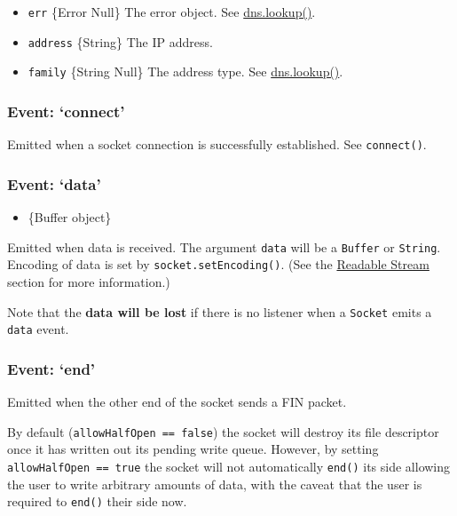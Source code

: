 \begin{itemize}
\itemsep1pt\parskip0pt
\item
  \texttt{err} \{Error \textbar{} Null\} The error object. See
  \href{dns.html\#dns_dns_lookup_domain_family_callback}{dns.lookup()}.
\item
  \texttt{address} \{String\} The IP address.
\item
  \texttt{family} \{String \textbar{} Null\} The address type. See
  \href{dns.html\#dns_dns_lookup_domain_family_callback}{dns.lookup()}.
\end{itemize}

\subsubsection{\texorpdfstring{Event:
`connect'}{Event: connect}}\label{event-connect}

Emitted when a socket connection is successfully established. See
\texttt{connect()}.

\subsubsection{\texorpdfstring{Event:
`data'}{Event: data}}\label{event-data}

\begin{itemize}
\itemsep1pt\parskip0pt
\item
  \{Buffer object\}
\end{itemize}

Emitted when data is received. The argument \texttt{data} will be a
\texttt{Buffer} or \texttt{String}. Encoding of data is set by
\texttt{socket.setEncoding()}. (See the
\href{stream.html\#stream_class_stream_readable}{Readable Stream}
section for more information.)

Note that the \textbf{data will be lost} if there is no listener when a
\texttt{Socket} emits a
\texttt{\textquotesingle{}data\textquotesingle{}} event.

\subsubsection{\texorpdfstring{Event:
`end'}{Event: end}}\label{event-end}

Emitted when the other end of the socket sends a FIN packet.

By default (\texttt{allowHalfOpen\ ==\ false}) the socket will destroy
its file descriptor once it has written out its pending write queue.
However, by setting \texttt{allowHalfOpen\ ==\ true} the socket will not
automatically \texttt{end()} its side allowing the user to write
arbitrary amounts of data, with the caveat that the user is required to
\texttt{end()} their side now.

